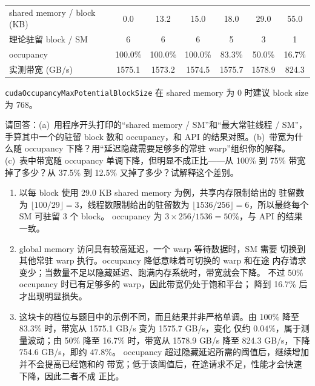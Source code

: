 \documentclass[11pt,a4paper,fontset=none]{ctexart}
\begin{document}
\begin{center}\small
  \begin{tabular}{@{}lcccccc@{}}
    \toprule
    shared memory / block (KB) & 0.0     & 13.2    & 15.0    & 18.0   & 29.0   & 55.0   \\
    理论驻留 block / SM            & 6       & 6       & 6       & 5      & 3      & 1      \\
    occupancy                  & 100.0\% & 100.0\% & 100.0\% & 83.3\% & 50.0\% & 16.7\% \\
    实测带宽 (GB/s)                & 1575.1  & 1573.2  & 1574.5  & 1575.7 & 1578.9 & 824.3  \\
    \bottomrule
  \end{tabular}
\end{center}

\texttt{cudaOccupancyMaxPotentialBlockSize} 在 shared memory 为 0 时建议
block size 为 768。

请回答：(a)~用程序开头打印的“shared memory / SM”和“最大常驻线程 / SM”，手算其中一个的驻留 block 数和 occupancy，和 API 的结果对照。(b)~带宽为什么随 occupancy 下降？用“延迟隐藏需要足够多的常驻 warp”组织你的解释。(c)~表中带宽随 occupancy 单调下降，但明显不成正比——从 100\% 到 75\% 带宽掉了多少？从 37.5\% 到 12.5\% 又掉了多少？试解释这个差别。

\begin{enumerate}[label=(\alph*)]
  \item 以每 block 使用 29.0 KB shared memory 为例，共享内存限制给出的
        驻留数为 $\lfloor 100/29\rfloor=3$，线程数限制给出的驻留数为
        $\lfloor 1536/256\rfloor=6$，所以最终每个 SM 可驻留 3 个 block。
        occupancy 为 $3\times256/1536=50\%$，与 API 的结果一致。
  \item global memory 访问具有较高延迟，一个 warp 等待数据时，SM 需要
        切换到其他常驻 warp 执行。occupancy 降低意味着可切换的 warp 和在途
        内存请求变少；当数量不足以隐藏延迟、跑满内存系统时，带宽就会下降。
        不过 50\% occupancy 时已有足够多的 warp，因此带宽仍处于饱和平台；
        降到 16.7\% 后才出现明显损失。
  \item 这块卡的档位与题目中的示例不同，而且结果并非严格单调。由
        100\% 降至 83.3\% 时，带宽从 1575.1 GB/s 变为 1575.7 GB/s，变化
        仅约 $0.04\%$，属于测量波动；由 50\% 降至 16.7\% 时，带宽从
        1578.9 GB/s 降至 824.3 GB/s，下降 754.6 GB/s，即约 $47.8\%$。
        occupancy 超过隐藏延迟所需的阈值后，继续增加并不会提高已经饱和的
        带宽；低于该阈值后，在途请求不足，性能才会快速下降，因此二者不成
        正比。
\end{enumerate}
\end{document}
